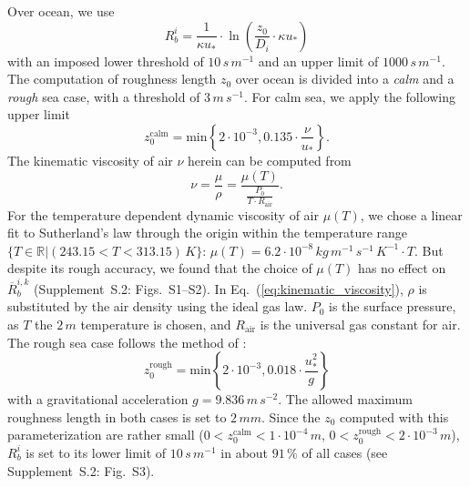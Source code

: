 \documentclass[gmd, manuscript]{copernicus}
\begin{document}
Over ocean, we use \citep[Eq.~(54),][]{ACP:Simpson2012}
\begin{equation}
  R_b^i = \frac{1}{\kappa u_*}\cdot\ln\left({\frac{z_0}{D_i}\cdot \kappa u_*}\right)
\end{equation}
with an imposed lower threshold of $10\,\unit{s\,m^{-1}}$ and an upper limit of $1000\,\unit{s\,m^{-1}}$. The computation of roughness length $z_0$ over ocean is divided into a \emph{calm} and a \emph{rough} sea case, with a threshold of $3\,\unit{m\,s^{-1}}$. For calm sea, we apply the following upper limit \citep[][with a slightly higher coefficient of $0.135$]{Hinze1975,Garratt1992}
\begin{equation}
  z_0^\text{calm} = \text{min}\left\{2\cdot10^{-3}, 0.135 \cdot \frac{\nu}{u_*}\right\}.
\end{equation}
The kinematic viscosity of air $\nu$ herein can be computed from 
\begin{equation}
  \nu = \frac{\mu}{\rho} = \frac{\mu(T)}{\frac{P_0}{T\cdot R_\text{air}}}.
  \label{eq:kinematic_viscosity}
\end{equation}
For the temperature dependent dynamic viscosity of air $\mu(T)$, we chose a linear fit to Sutherland's law through the origin within the temperature range $\{T \in \mathbb{R} | (243.15 < T < 313.15)\,\unit{K}\}$: $\mu(T) = 6.2\cdot 10^{-8}\,\unit{kg\,m^{-1}\,s^{-1}\,K^{-1}} \cdot T$. But despite its rough accuracy, we found that the choice of $\mu(T)$ has no effect on $\overline{R}_b^{i,k}$ (Supplement~S.2: Figs.~S1--S2). In Eq.~(\ref{eq:kinematic_viscosity}), $\rho$ is substituted by the air density using the ideal gas law. $P_0$ is the surface pressure, as $T$ the $2\,\unit{m}$ temperature is chosen, and $R_\text{air}$ is the universal gas constant for air.
The rough sea case follows the method of \citet{QJRMS:Charnock1955,JPO:Wu1980}:
\begin{equation}
  z_0^\text{rough} = \text{min}\left\{2\cdot10^{-3}, 0.018 \cdot \frac{u^2_*}{g}\right\}
\end{equation}
with a gravitational acceleration $g = 9.836\,\unit{m\,s^{-2}}$. The allowed maximum roughness length in both cases is set to $2\,\unit{mm}$. Since the $z_0$ computed with this parameterization are rather small ($0 < z_0^\text{calm} < 1\cdot 10^{-4}\,\unit{m}$, $0 < z_0^\text{rough} < 2 \cdot 10^{-3}\,\unit{m}$), $R^i_b$ is set to its lower limit of $10\,\unit{s\,m^{-1}}$ in about $91\,\unit{\%}$ of all cases (see Supplement~S.2: Fig.~S3). 
\end{document}
